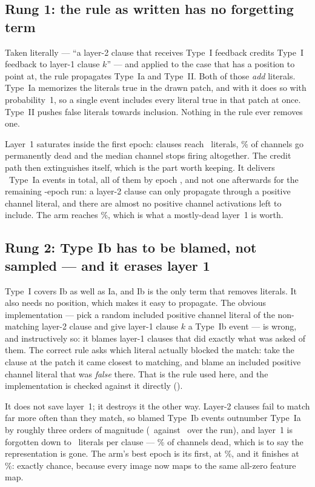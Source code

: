 \subsection{Rung 1: the rule as written has no forgetting term}

Taken literally --- ``a layer-2 clause that receives Type~I feedback credits Type~I feedback to
layer-1 clause $k$'' --- and applied to the case that has a position to point at, the rule
propagates Type~Ia and Type~II. Both of those \emph{add} literals. Type~Ia memorizes the
literals true in the drawn patch, and with  it does so with
probability~1, so a single event includes every literal true in that patch at once. Type~II
pushes false literals towards inclusion. Nothing in the rule ever removes one.

Layer~1 saturates inside the first epoch: clauses reach \lOneSizeMctmCreditIa\ literals,
\lOneDeadMctmCreditIa{}\% of channels go permanently dead and the median channel stops firing
altogether. The credit path then extinguishes itself, which is the part worth keeping. It
delivers \eventsMctmCreditIa\ Type~Ia events in total, all of them by epoch
\lastEventMctmCreditIa, and not one afterwards for the remaining \epochsRun-epoch run: a
layer-2 clause can only propagate through a positive channel literal, and there are almost no
positive channel activations left to include. The arm reaches \accMctmCreditIa{}\%, which is
what a mostly-dead layer~1 is worth.

\subsection{Rung 2: Type Ib has to be blamed, not sampled --- and it erases layer 1}

Type~I covers Ib as well as Ia, and Ib is the only term that removes literals. It also needs
no position, which makes it easy to propagate. The obvious implementation --- pick a random
included positive channel literal of the non-matching layer-2 clause and give layer-1 clause
$k$ a Type~Ib event --- is wrong, and instructively so: it blames layer-1 clauses that did
exactly what was asked of them. The correct rule asks which literal actually blocked the
match: take the clause at the patch it came closest to matching, and blame an included
positive channel literal that was \emph{false} there. That is the rule used here, and the
implementation is checked against it directly ().

It does not save layer~1; it destroys it the other way. Layer-2 clauses fail to match far more
often than they match, so blamed Type~Ib events outnumber Type~Ia by roughly three orders of
magnitude (\eventsIbMctmCreditIb\ against \eventsMctmCreditIb\ over the run), and layer~1 is
forgotten down to \lOneSizeMctmCreditIb\ literals per clause --- \lOneDeadMctmCreditIb{}\% of
channels dead, which is to say the representation is gone. The arm's best epoch is its first,
at \accMctmCreditIb{}\%, and it finishes at \finMctmCreditIb{}\%: exactly chance, because every
image now maps to the same all-zero feature map.

